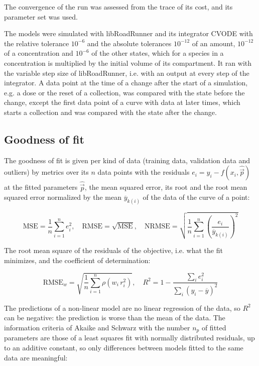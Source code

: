 The convergence of the run was assessed from the trace of its cost, and its parameter set was used.

The models were simulated with libRoadRunner \cite{Welsh2023} and its integrator CVODE \cite{Hindmarsh2005} with the relative tolerance $10^{-6}$ and the absolute tolerances $10^{-12}$ of an amount, $10^{-12}$ of a concentration and $10^{-6}$ of the other states, which for a species in a concentration is multiplied by the initial volume of its compartment. It ran with the variable step size of libRoadRunner, i.e. with an output at every step of the integrator. A data point at the time of a change after the start of a simulation, e.g. a dose or the reset of a collection, was compared with the state before the change, except the first data point of a curve with data at later times, which starts a collection and was compared with the state after the change.

\subsection{Goodness of fit}

The goodness of fit is given per kind of data (training data, validation data and outliers) by metrics over its $n$ data points with the residuals $e_i = y_i - f(x_i, \hat{\vec{p}})$ at the fitted parameters $\hat{\vec{p}}$, the mean squared error, its root and the root mean squared error normalized by the mean $\overline{y}_{k(i)}$ of the data of the curve of a point:

\begin{equation}
\mathrm{MSE} = \frac{1}{n} \sum_{i=1}^{n} e_i^2, \quad \mathrm{RMSE} = \sqrt{\mathrm{MSE}}, \quad \mathrm{NRMSE} = \sqrt{\frac{1}{n} \sum_{i=1}^{n} \left(\frac{e_i}{\overline{y}_{k(i)}}\right)^2}
\end{equation}

The root mean square of the residuals of the objective, i.e. what the fit minimizes, and the coefficient of determination:

\begin{equation}
\mathrm{RMSE}_w = \sqrt{\frac{1}{n} \sum_{i=1}^{n} \rho\left(w_i\, r_i^2\right)}, \quad R^2 = 1 - \frac{\sum_{i} e_i^2}{\sum_{i} \left(y_i - \overline{y}\right)^2}
\end{equation}

The predictions of a non-linear model are no linear regression of the data, so $R^2$ can be negative: the prediction is worse than the mean of the data. The information criteria of Akaike \cite{Akaike1974} and Schwarz \cite{Schwarz1978} with the number $n_p$ of fitted parameters are those of a least squares fit with normally distributed residuals, up to an additive constant, so only differences between models fitted to the same data are meaningful:

